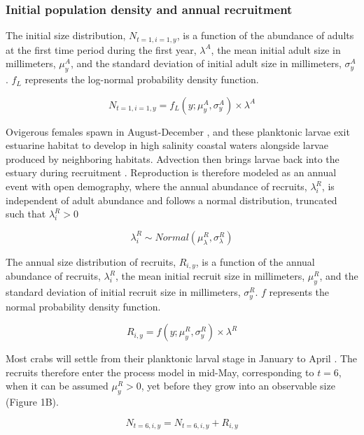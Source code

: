 \documentclass{article}
\begin{document}
\subsubsection*{Initial population density and annual recruitment}

The initial size distribution, $N_{t=1, i=1, y}$, is a function of the abundance of adults at the first time period during the first year, $\lambda^{A}$, the mean initial adult size in millimeters, $\mu^A_{y}$, and the standard deviation of initial adult size in millimeters, $\sigma^A_{y}$. $f_L$ represents the log-normal probability density function.

\begin{equation}
N_{t=1, i=1, y} = f_L(y; \mu^A_{y}, \sigma^A_{y}) \times \lambda^A
\end{equation}

Ovigerous females spawn in August-December \parencite{klassen2007biological}, and these planktonic larvae exit estuarine habitat to develop in high salinity coastal waters alongside larvae produced by neighboring habitats. Advection then brings larvae back into the estuary during recruitment \parencite{young2019life}. Reproduction is therefore modeled as an annual event with open demography, where the annual abundance of recruits, $\lambda^R_i$, is independent of adult abundance and follows a normal distribution, truncated such that $\lambda^R_i > 0$  

\begin{equation}
\lambda^R_i \sim Normal(\mu^R_{\lambda}, \sigma^R_{\lambda})
\end{equation}

The annual size distribution of recruits, $R_{i, y}$, is a function of the annual abundance of recruits, $\lambda^R_i$, the mean initial recruit size in millimeters, $\mu^R_y$, and the standard deviation of initial recruit size in millimeters, $\sigma^R_y$. $f$ represents the normal probability density function.

\begin{equation}
R_{i, y} = f(y; \mu^R_{y}, \sigma^R_{y}) \times \lambda^R
\end{equation}

Most crabs will settle from their planktonic larval stage in January to April \parencite{yamada2005growth}. The recruits therefore enter the process model in mid-May, corresponding to $t=6$, when it can be assumed $\mu^R_y > 0$, yet before they grow into an observable size (Figure 1B).

\begin{equation}
N_{t=6, i, y} =  N_{t=6, i, y} + R_{i, y}
\end{equation}
\end{document}
